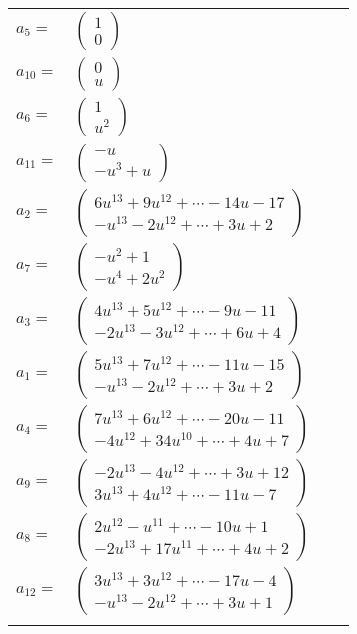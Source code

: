 \documentclass[1p]{elsarticle_modified}
\theoremstyle{definition}
\begin{document}
\begin{tabular}{m{7pt} m{180pt} m{7pt} m{180pt} }
\flushright $a_{5}=$&$\begin{pmatrix}1\\0\end{pmatrix}$ \\
\flushright $a_{10}=$&$\begin{pmatrix}0\\u\end{pmatrix}$ \\
\flushright $a_{6}=$&$\begin{pmatrix}1\\u^2\end{pmatrix}$ \\
\flushright $a_{11}=$&$\begin{pmatrix}- u\\- u^3+u\end{pmatrix}$ \\
\flushright $a_{2}=$&$\begin{pmatrix}6 u^{13}+9 u^{12}+\cdots-14 u-17\\- u^{13}-2 u^{12}+\cdots+3 u+2\end{pmatrix}$ \\
\flushright $a_{7}=$&$\begin{pmatrix}- u^2+1\\- u^4+2 u^2\end{pmatrix}$ \\
\flushright $a_{3}=$&$\begin{pmatrix}4 u^{13}+5 u^{12}+\cdots-9 u-11\\-2 u^{13}-3 u^{12}+\cdots+6 u+4\end{pmatrix}$ \\
\flushright $a_{1}=$&$\begin{pmatrix}5 u^{13}+7 u^{12}+\cdots-11 u-15\\- u^{13}-2 u^{12}+\cdots+3 u+2\end{pmatrix}$ \\
\flushright $a_{4}=$&$\begin{pmatrix}7 u^{13}+6 u^{12}+\cdots-20 u-11\\-4 u^{12}+34 u^{10}+\cdots+4 u+7\end{pmatrix}$ \\
\flushright $a_{9}=$&$\begin{pmatrix}-2 u^{13}-4 u^{12}+\cdots+3 u+12\\3 u^{13}+4 u^{12}+\cdots-11 u-7\end{pmatrix}$ \\
\flushright $a_{8}=$&$\begin{pmatrix}2 u^{12}- u^{11}+\cdots-10 u+1\\-2 u^{13}+17 u^{11}+\cdots+4 u+2\end{pmatrix}$ \\
\flushright $a_{12}=$&$\begin{pmatrix}3 u^{13}+3 u^{12}+\cdots-17 u-4\\- u^{13}-2 u^{12}+\cdots+3 u+1\end{pmatrix}$\\&\end{tabular}
\end{document}
